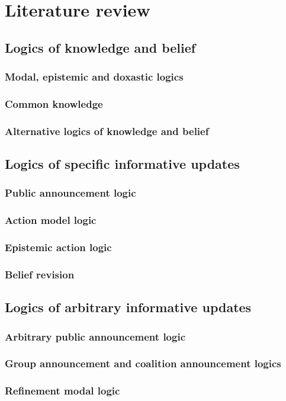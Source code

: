 \chapter{Literature review}\label{literature}

\section{Logics of knowledge and belief}

\subsection{Modal, epistemic and doxastic logics}

\subsection{Common knowledge}

\subsection{Alternative logics of knowledge and belief}

\section{Logics of specific informative updates}

\subsection{Public announcement logic}

\subsection{Action model logic}

\subsection{Epistemic action logic}

\subsection{Belief revision}

\section{Logics of arbitrary informative updates}

\subsection{Arbitrary public announcement logic}

\subsection{Group announcement and coalition announcement logics}

\subsection{Refinement modal logic}
